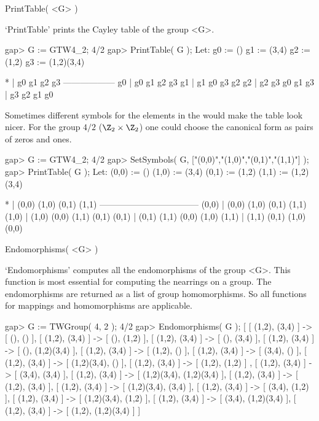 

\>PrintTable( <G> )

`PrintTable' prints the Cayley table of the group <G>.

\beginexample
    gap> G := GTW4_2;
    4/2
    gap> PrintTable( G );
    Let:
    g0 := ()
    g1 := (3,4)
    g2 := (1,2)
    g3 := (1,2)(3,4)

      *  | g0 g1 g2 g3 
     ------------------
      g0 | g0 g1 g2 g3 
      g1 | g1 g0 g3 g2 
      g2 | g2 g3 g0 g1 
      g3 | g3 g2 g1 g0 

\endexample

Sometimes different symbols for the elements in the would make the table
look nicer. For the group $4/2$ ($\Z_2 \times \Z_2$) one could choose
the canonical form as pairs of zeros and ones.

\beginexample
    gap> G := GTW4_2;
    4/2
    gap> SetSymbols( G, ["(0,0)","(1,0)","(0,1)","(1,1)"] );
    gap> PrintTable( G );
    Let:
    (0,0) := ()
    (1,0) := (3,4)
    (0,1) := (1,2)
    (1,1) := (1,2)(3,4)

          *  | (0,0)  (1,0)  (0,1)  (1,1)  
      -----------------------------------
      (0,0)  | (0,0)  (1,0)  (0,1)  (1,1)  
      (1,0)  | (1,0)  (0,0)  (1,1)  (0,1)  
      (0,1)  | (0,1)  (1,1)  (0,0)  (1,0)  
      (1,1)  | (1,1)  (0,1)  (1,0)  (0,0)  
\endexample



\>Endomorphisms( <G> )

`Endomorphisms' computes all the endomorphisms of the group <G>. 
This function is most essential for computing the nearrings on a group.
The endomorphisms are returned as a list of group homomorphisms. So all
functions for mappings and homomorphisms are applicable.

\beginexample
    gap> G := TWGroup( 4, 2 );
    4/2
    gap> Endomorphisms( G );
    [ [ (1,2), (3,4) ] -> [ (), () ], [ (1,2), (3,4) ] -> [ (), (1,2) ],
      [ (1,2), (3,4) ] -> [ (), (3,4) ], [ (1,2), (3,4) ] -> [ (), (1,2)(3,4) ],
      [ (1,2), (3,4) ] -> [ (1,2), () ], [ (1,2), (3,4) ] -> [ (3,4), () ],
      [ (1,2), (3,4) ] -> [ (1,2)(3,4), () ], [ (1,2), (3,4) ] -> [ (1,2), (1,2) ]
        , [ (1,2), (3,4) ] -> [ (3,4), (3,4) ],
      [ (1,2), (3,4) ] -> [ (1,2)(3,4), (1,2)(3,4) ],
      [ (1,2), (3,4) ] -> [ (1,2), (3,4) ],
      [ (1,2), (3,4) ] -> [ (1,2)(3,4), (3,4) ],
      [ (1,2), (3,4) ] -> [ (3,4), (1,2) ],
      [ (1,2), (3,4) ] -> [ (1,2)(3,4), (1,2) ],
      [ (1,2), (3,4) ] -> [ (3,4), (1,2)(3,4) ],
      [ (1,2), (3,4) ] -> [ (1,2), (1,2)(3,4) ] ]
\endexample

